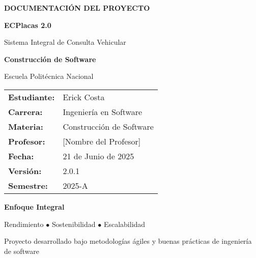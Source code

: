\documentclass[12pt,a4paper]{article}
\begin{document}
\begin{titlepage}
    \centering
    \vspace*{1.5cm}
    
    \vspace{1cm}
    
    {\Huge\textbf{\textcolor{epnblue}{DOCUMENTACIÓN DEL PROYECTO}}\par}
    \vspace{0.5cm}
    {\LARGE\textbf{\textcolor{epnblue}{ECPlacas 2.0}}\par}
    \vspace{0.3cm}
    {\large Sistema Integral de Consulta Vehicular\par}
    \vspace{1.5cm}
    
    {\Large\textbf{Construcción de Software}\par}
    \vspace{0.3cm}
    {\large Escuela Politécnica Nacional\par}
    \vspace{2cm}
    
    \begin{tabular}{l l}
        \textbf{Estudiante:} & Erick Costa \\
        \textbf{Carrera:} & Ingeniería en Software \\
        \textbf{Materia:} & Construcción de Software \\
        \textbf{Profesor:} & [Nombre del Profesor] \\
        \textbf{Fecha:} & 21 de Junio de 2025 \\
        \textbf{Versión:} & 2.0.1 \\
        \textbf{Semestre:} & 2025-A \\
    \end{tabular}
    
    \vfill
    
    {\large\textbf{\textcolor{epnblue}{Enfoque Integral}}\par}
    {\normalsize Rendimiento $\bullet$ Sostenibilidad $\bullet$ Escalabilidad\par}
    
    \vspace{1cm}
    
    {\footnotesize\textcolor{epngray}{Proyecto desarrollado bajo metodologías ágiles y buenas prácticas de ingeniería de software}}
    
\end{titlepage}
\end{document}
